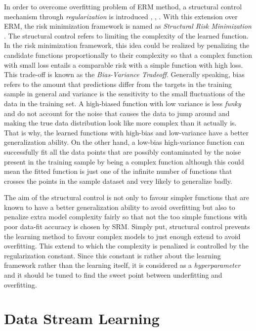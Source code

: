 {In order to overcome overfitting problem of ERM method, a structural control mechanism through \textit{regularization} is introduced \cite{phillips_technique_1962}, \cite{tikhonov_regularization_1963}, \cite{ivanov_linear_1962}. With this extension over ERM, the risk minimization framework is named as \textit{Structural Risk Minimization} \cite{vapnik_nature_2000}. The structural control refers to limiting the complexity of the learned function. In the risk minimization framework, this idea could be realized by penalizing the candidate functions proportionally to their complexity so that a complex function with small loss entails a comparable risk with a simple function with high loss. This trade-off is known as the \textit{Bias-Variance Tradeoff}. Generally speaking, bias refers to the amount that predictions differ from the targets in the training sample in general and variance is the sensitivity to the small fluctuations of the data in the training set. A high-biased function with low variance is less \textit{funky} and do not account for the noise that causes the data to jump around and making the true data distribution look like more complex than it actually is. That is why, the learned functions with high-bias and low-variance have a better generalization ability. On the other hand, a low-bias high-variance function can successfully fit all the data points that are possibly contaminated by the noise present in the training sample by being a complex function although this could mean the fitted function is just one of the infinite number of functions that crosses the points in the sample dataset and very likely to generalize badly.

The aim of the structural control is not only to favour simpler functions that are known to have a better generalization ability to avoid overfitting but also to penalize extra model complexity fairly so that not the too simple functions with poor data-fit accuracy is chosen by SRM. Simply put, structural control prevents the learning method to favour complex models to just enough extend to avoid overfitting. This extend to which the complexity is penalized is controlled by the regularization constant. Since this constant is rather about the learning framework rather than the learning itself, it is considered as a \textit{hyperparameter} and it should be tuned to find the sweet point between underfitting and overfitting.

\section{Data Stream Learning}
\label{section:data_stream_learning}

}
